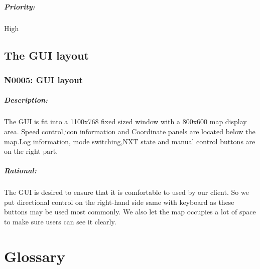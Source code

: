 \documentclass[11pt, a4paper]{report}
\begin{document}
\paragraph{Priority:}
High

\section{The GUI layout}

\subsection{N0005: GUI layout}
\paragraph{Description:}
The GUI is fit into a 1100x768 fixed sized window with a 800x600 map display area. Speed control,icon information and Coordinate panels are located below the map.Log information, mode switching,NXT state and manual control buttons are on the right part.
\paragraph{Rational:}
The GUI is desired to ensure that it is comfortable to used by our client. So we put directional control on the right-hand side same with keyboard as these buttons may be used most commonly. We also let the map occupies a lot of space to make sure users can see it clearly.


\pagebreak

\newpage
\appendix

\pagebreak

\chapter{Glossary}
\end{document}
